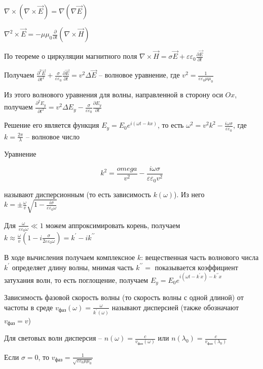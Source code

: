 $\nabla \times (\nabla \times \vec E) = \nabla (\nabla \vec E)$

$\nabla^2 \times \vec E = -\mu\mu_0 \frac{\partial}{\partial t} (\nabla \times \vec H)$

По теореме о циркуляции магнитного поля $\nabla \times \vec H = \sigma \vec E + \varepsilon \varepsilon_0 \frac{\partial \vec E}{\partial t}$

Получаем $\frac{\partial^2 \vec E}{\partial t^2} + \frac{\sigma}{\varepsilon \varepsilon_0} \frac{\partial \vec E}{\partial t} = v^2 \Delta \vec E$ -- волновое уравнение, где $v^2 = \frac{1}{\varepsilon \varepsilon_0 \mu \mu_0}$

Из этого волнового уравнения для волны, направленной в сторону оси $Ox$, получаем $\frac{\partial^2 E_y}{\partial t^2} = v^2 \Delta E_y - \frac{\sigma}{\varepsilon \varepsilon_0} \frac{\partial E_y}{\partial t}$

Решение его является функция $E_y = E_0 e^{i (\omega t - k x)}$, то есть $\omega^2 = v^2 k^2 - \frac{i \omega \sigma}{\varepsilon \varepsilon_0}$, где $k = \frac{2\pi}{\lambda}$ -- волновое число

Уравнение 

\[k^2 = \frac{omega}{v^2} - \frac{i \omega \sigma}{\varepsilon \varepsilon_0 v^2}\]

называют дисперсионным (то есть зависимость $k(\omega)$). Из него $k = \pm \frac{\omega}{v} \sqrt{1 - \frac{i \sigma}{\varepsilon \varepsilon_0 \omega}}$

Для $\frac{\omega}{\varepsilon\varepsilon_0 \omega} \ll 1$ можем аппроксимировать корень, получаем $k \approx \frac{\omega}{v} (1 - i \frac{\sigma}{2\varepsilon\varepsilon_0 \omega}) = k^\prime - i k^{\prime\prime}$

В ходе вычисления получаем комплексное $k$: вещественная часть волнового числа $k^\prime$ определяет длину волны, мнимая часть $k^{\prime\prime} = $ показывается коэффициент затухания волн, то есть поглощение, получаем $E_y = E_0 e^{i (\omega t - k^{\prime} x) - k^{\prime\prime} x}$

Зависимость фазовой скорость волны (то скорость волны с одной длиной) от частоты в среде $v_\text{фаз}(\omega) = \frac{\omega}{k^{\prime}(\omega)}$ называют дисперсией (также обозначают $v_{\text{фаз}} = v$)

Для световых волн дисперсия -- $n(\omega) = \frac{c}{v_{\text{фаз}}(\omega)}$ или $n(\lambda_0) = \frac{c}{v_{\text{фаз}}(\lambda_0)}$

Если $\sigma = 0$, то $v_{\text{фаз}} = \frac{1}{\sqrt{\varepsilon \varepsilon_0 \mu \mu_0}}$

